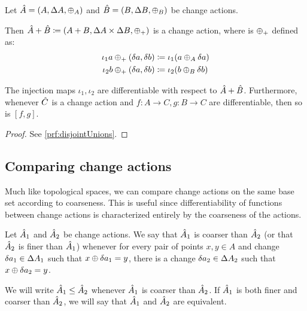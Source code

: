 \begin{prop}[name=Disjoint unions, restate=disjointUnions]
  \label{prop:disjointUnions}
  Let $\hat{A} = (A,\Delta A,\oplus_A)$ and $\hat{B} =
  (B,\Delta B,\oplus_B)$ be change actions.

  Then $\hat{A} + \hat{B} \coloneqq (A + B,\Delta A \times
  \Delta B,\oplus_{+})$ is a change action, where is $\oplus_{+}$ defined as:
  \begin{align*}
    \iota_1 a \oplus_{+} (\delta a, \delta b) &\coloneqq \iota_1 (a \oplus_A \delta a)\\
    \iota_2 b \oplus_{+} (\delta a, \delta b) &\coloneqq \iota_2 (b \oplus_B \delta b)
  \end{align*}
  
  The injection maps $\iota_1, \iota_2$ are differentiable with respect to $\hat{A} + \hat{B}$. Furthermore,
  whenever $\hat{C}$ is a change action and $f : A \rightarrow C, g: B \rightarrow C$ are differentiable,
  then so is $\left[ f, g \right]$.
\end{prop}
\ifproofs
\begin{proof}
  See \cref{prf:disjointUnions}.
\end{proof}
\fi

\subsection{Comparing change actions}

Much like topological spaces, we can compare change actions on the same
base set according to coarseness. This 
is useful since differentiability of functions between change actions is characterized
entirely by the coarseness of the actions.

\begin{defn}
  Let $\hat{A}_1$ and $ \hat{A}_2$ be 
  change actions. We say that $\hat{A}_1$ is coarser than $\hat{A}_2$ (or that $\hat{A}_2$ is finer
  than $\hat{A}_1$) whenever for every pair of points $x, y \in A$ and change $\delta a_1 \in \Delta A_1$
  such that $x \oplus \delta a_1 = y$, there is a change $\delta a_2 \in \Delta A_2$ such that $x \oplus \delta a_2 = y$.
  
  We will write $\hat{A}_1 \leq \hat{A}_2$ whenever $\hat{A}_1$ is coarser than $\hat{A}_2$.
  If $\hat{A}_1$ is both finer and coarser than $\hat{A}_2$, we will say that $\hat{A}_1$
  and $\hat{A}_2$ are equivalent.
\end{defn}

